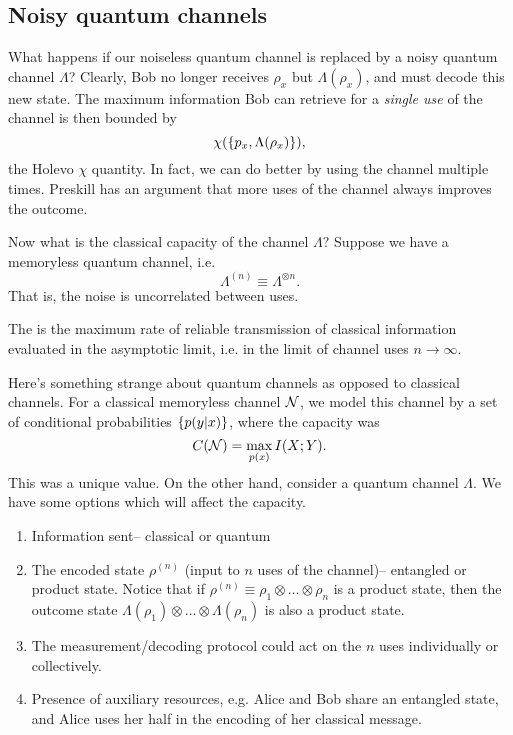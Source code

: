 \subsection*{Noisy quantum channels}
What happens if our noiseless quantum channel is replaced by a noisy quantum channel $\Lambda$? Clearly, Bob no longer receives $\rho_x$ but $\Lambda(\rho_x)$, and must decode this new state. The maximum information Bob can retrieve for a \emph{single use} of the channel is then bounded by
\begin{equation}
    \chi(\{p_x,\Lambda(\rho_x)\}),
\end{equation}
the Holevo $\chi$ quantity. In fact, we can do better by using the channel multiple times. Preskill has an argument that more uses of the channel always improves the outcome.

Now what is the classical capacity of the channel $\Lambda$? Suppose we have a memoryless quantum channel, i.e.
\begin{equation}
    \Lambda^{(n)} \equiv \Lambda^{\otimes n}.
\end{equation}
That is, the noise is uncorrelated between uses.

\begin{defn}
    The  is the maximum rate of reliable transmission of classical information evaluated in the asymptotic limit, i.e. in the limit of channel uses $n\to \infty$.
\end{defn}

Here's something strange about quantum channels as opposed to classical channels. For a classical memoryless channel $\mathcal N$, we model this channel by a set of conditional probabilities $\{p(y|x)\}$, where the capacity was
\begin{equation}
    C(\mathcal N)=\max_{p(x)} I(X;Y).
\end{equation}
This was a unique value. On the other hand, consider a quantum channel $\Lambda$. We have some options which will affect the capacity.
\begin{enumerate}
    \item Information sent-- classical or quantum
    \item The encoded state $\rho^{(n)}$ (input to $n$ uses of the channel)-- entangled or product state. Notice that if $\rho^{(n)} \equiv \rho_1 \otimes \ldots \otimes \rho_n$ is a product state, then the outcome state $\Lambda(\rho_1) \otimes \ldots \otimes \Lambda(\rho_n)$ is also a product state.
    \item The measurement/decoding protocol could act on the $n$ uses individually or collectively.
    \item Presence of auxiliary resources, e.g. Alice and Bob share an entangled state, and Alice uses her half in the encoding of her classical message.
\end{enumerate}

